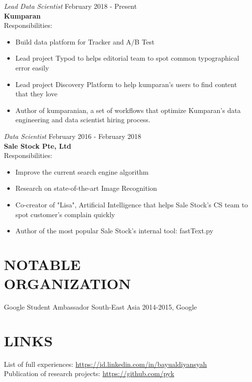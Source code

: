 \documentclass[margin, 10pt]{res} %
\begin{document}
\begin{resume}
{\sl Lead Data Scientist} \hfill February 2018 - Present \\
\textbf{Kumparan} \\
Responsibilities:
\begin{itemize} \itemsep -2pt %
\item Build data platform for Tracker and A/B Test
\item Lead project Typod to helps editorial team to spot common typographical error easily
\item Lead project Discovery Platform to help kumparan's users to find content that they love
\item Author of kumparanian, a set of workflows that optimize Kumparan's
data engineering and data scientist hiring process.
\end{itemize}

{\sl Data Scientist} \hfill February 2016 - February 2018 \\
\textbf{Sale Stock Pte, Ltd} \\
Responsibilities:
\begin{itemize} \itemsep -2pt %
\item Improve the current search engine algorithm
\item Research on state-of-the-art Image Recognition
\item Co-creator of "Lisa", Artificial Intelligence that helps Sale Stock's CS team to spot customer's complain quickly
\item Author of the most popular Sale Stock's internal tool: fastText.py
\end{itemize}


\section{NOTABLE\\ORGANIZATION}

Google Student Ambassador South-East Asia 2014-2015, Google\\



\section{LINKS}
List of full experiences: \url{https://id.linkedin.com/in/bayualdiyansyah}\\
Publication of research projects: \url{https://github.com/pyk}\\


\end{resume}
\end{document}
